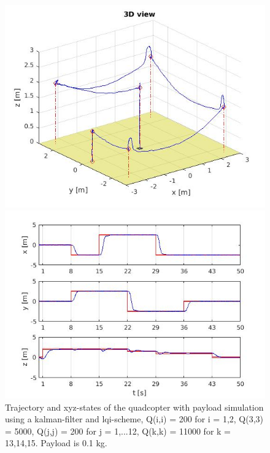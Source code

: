\documentclass[]{article}
\begin{document}
\begin{figure}[H]
\begin{minipage}{.5\textwidth}
\includegraphics[width=\textwidth]{kaltraj2pay.jpg}
\end{minipage}%
\begin{minipage}{.5\textwidth}
\includegraphics[width=\textwidth]{kalstate2pay.jpg}
\end{minipage}
\caption{Trajectory and xyz-states of the quadcopter with payload simulation using a kalman-filter and lqi-scheme, Q(i,i)  = 200 for i = 1,2, Q(3,3) = 5000, Q(j,j) = 200 for j = 1,...12, Q(k,k) = 11000 for k = 13,14,15. Payload is 0.1 kg.}
\end{figure}
\end{document}
